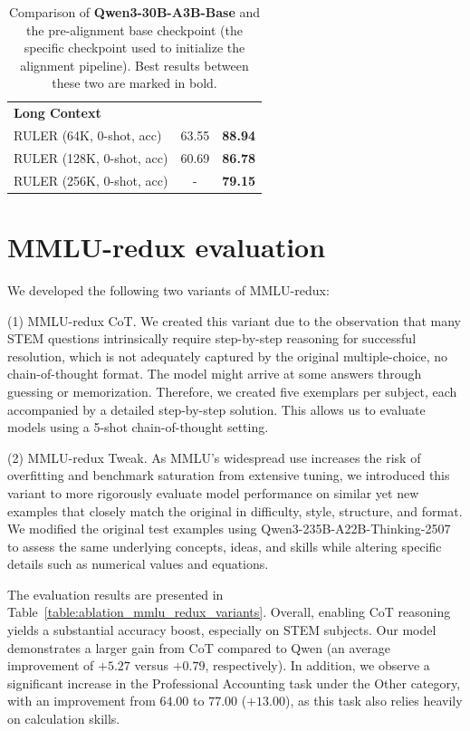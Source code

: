 \begin{table}[!hbt]
\begin{tabular}{l|cc}
\multicolumn{3}{l}{\textbf{Long Context}} \\
RULER (64K, 0-shot, acc) & 63.55 & \textbf{88.94} \\
RULER (128K, 0-shot, acc) & 60.69 & \textbf{86.78} \\
RULER (256K, 0-shot, acc) & - & \textbf{79.15} \\
\bottomrule
\end{tabular}
\caption[Comparison of Qwen3 vs N-Nano-3]{
    Comparison of \textbf{Qwen3-30B-A3B-Base} and the \textbf{\ourmodel} pre-alignment base checkpoint (the specific checkpoint used to initialize the alignment pipeline). Best results between these two are marked in bold. 
}
\label{tab:base-model-comparison-reproducible}
\end{table}


\section{MMLU-redux evaluation}
\label{appendix:mmlu_redux_evaluation}

We developed the following two variants of MMLU-redux:

(1) MMLU-redux CoT. We created this variant due to the observation that many STEM questions intrinsically require step-by-step reasoning for successful resolution, which is not adequately captured by the original multiple-choice, no chain-of-thought format. The model might arrive at some answers through guessing or memorization. Therefore, we created five exemplars per subject, each accompanied by a detailed step-by-step solution. This allows us to evaluate models using a 5-shot chain-of-thought setting.

(2) MMLU-redux Tweak.
As MMLU's widespread use increases the risk of overfitting and benchmark saturation from extensive tuning, we introduced this variant to more rigorously evaluate model performance on similar yet new examples that closely match the original in difficulty, style, structure, and format.
We modified the original test examples using Qwen3-235B-A22B-Thinking-2507 to assess the same underlying concepts, ideas, and skills while altering specific details such as numerical values and equations.

The evaluation results are presented in Table~\ref{table:ablation_mmlu_redux_variants}.
Overall, enabling CoT reasoning yields a substantial accuracy boost, especially on STEM subjects.
Our model demonstrates a larger gain from CoT compared to Qwen (an average improvement of $+5.27$ versus $+0.79$, respectively).
In addition, we observe a significant increase in the Professional Accounting task under the Other category, with an improvement from $64.00$ to $77.00$ ($+13.00$), as this task also relies heavily on calculation skills.

